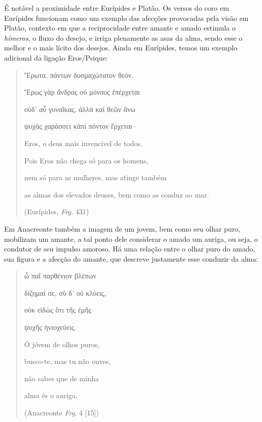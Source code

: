 É notável a proximidade entre Eurípides e Platão. Os versos do coro em
Eurípides funcionam como um exemplo das afecções provocadas pela visão
em Platão, contexto em que a reciprocidade entre amante e amado estimula
o \emph{hímeros}, o fluxo do desejo, e irriga plenamente as asas da
alma, sendo esse o melhor e o mais lícito dos desejos. Ainda em
Eurípides, temos um exemplo adicional da ligação Eros/Psique:

\begin{quote}
Ἔρωτα, πάντων δυσμαχώτατον θεόν.

Ἔρως γὰρ ἄνδρας οὐ μόνους ἐπέρχεται

οὐδ' αὖ γυναῖκας, ἀλλὰ καὶ θεῶν ἄνω

ψυχὰς χαράσσει κἀπὶ πόντον ἔρχεται·

Eros, o deus mais invencível de todos.

Pois Eros não chega só para os homens,

nem só para as mulheres, mas atinge também

as almas dos elevados deuses, bem como as conduz ao mar.

(Eurípides, \emph{Frg.} 431)
\end{quote}

Em Anacreonte também a imagem de um jovem, bem como seu olhar puro,
mobilizam um amante, a tal ponto dele considerar o amado um auriga, ou
seja, o condutor de seu impulso amoroso. Há uma relação entre o olhar
puro do amado, sua figura e a afecção do amante, que descreve justamente
esse conduzir da alma:

\begin{quote}
ὦ παῖ παρθένιον βλέπων

δίζημαί σε, σὺ δ' οὐ κλύεις,

οὐκ εἰδὼς ὅτι τῆς ἐμῆς

ψυχῆς ἡνιοχεύεις.

Ó jóvem de olhos puros,

busco-te, mas tu não ouves,

não sabes que de minha

alma és o auriga.

(Anacreonte \emph{Frg}. 4 {[}15{]})
\end{quote}

